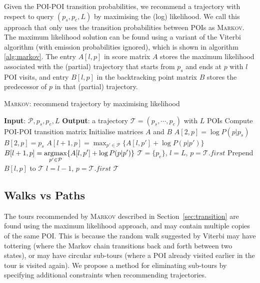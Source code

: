 Given the POI-POI transition probabilities, we recommend a trajectory with respect to query
$(p_s, p_e, L)$ by maximising the (log) likelihood. We call this approach that only uses the
transition probabilities between POIs as \textsc{Markov}. The maximum likelihood solution
can be found using a variant of the Viterbi algorithm (with emission probabilities ignored),
which is shown in algorithm \ref{alg:markov}.
The entry $A[l, p]$ in score matrix $A$ stores the maximum likelihood associated with the (partial) trajectory 
that starts from $p_s$ and ends at $p$ with $l$ POI visits, 
and entry $B[l, p]$ in the backtracking point matrix $B$ stores the predecessor of $p$ in that (partial) trajectory.

\begin{algorithm}[t]
\caption{\textsc{Markov}: recommend trajectory by maximising likelihood}
\label{alg:markov}
\begin{algorithmic}[1]
\STATE \textbf{Input}: $\mathcal{P}, p_s, p_e, L$
\STATE \textbf{Output}: a trajectory $\mathcal{T} = (p_s, \cdots, p_e)$ with $L$ POIs
\STATE Compute POI-POI transition matrix
\STATE Initialise matrices $A$ and $B$
    \STATE $A[2, p] = \log P(p|p_s)$
    \STATE $B[2, p] = p_s$
\ENDFOR
{}
        \STATE \(\displaystyle A[l+1, p] = \max_{p' \in \mathcal{P}} \{ A[l, p'] + \log P(p|p') \} \)
        \STATE \(\displaystyle B[l+1, p] = \operatorname*{argmax}_{p' \in \mathcal{P}} \{ A[l, p'] + \log P(p|p') \} \)
    \ENDFOR
\ENDFOR
\STATE $\mathcal{T} = \{p_e\}$, $l = L$, $p = \mathcal{T}.first$
\REPEAT
    \STATE Prepend $B[l, p]$ to $\mathcal{T}$
    \STATE $l = l - 1$, $p = \mathcal{T}.first$
\RETURN $\mathcal{T}$
\end{algorithmic}
\end{algorithm}



\subsection{Walks vs Paths}
\label{sec:walkpath}

The tours recommended by \textsc{Markov} described in Section~\ref{sec:transition} are found
using the maximum likelihood approach, and may contain multiple copies of the same POI.
This is because the random walk suggested by Viterbi may have
tottering (where the Markov chain transitions back and forth between two states),
or may have circular sub-tours (where a POI already visited earlier in the tour is
visited again).
We propose a method for eliminating sub-tours by specifying additional constraints
when recommending trajectories.

